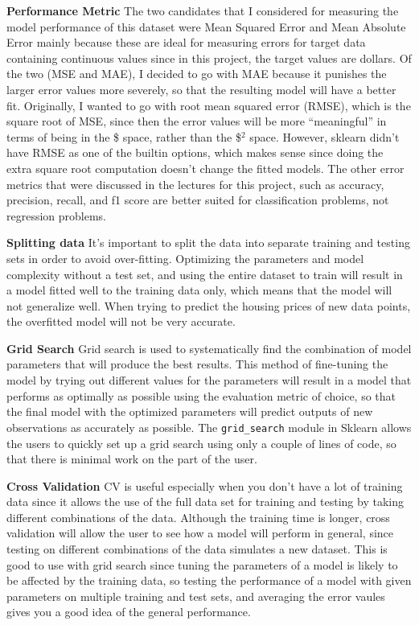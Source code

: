 \documentclass{article}
\begin{document}
    \textbf{Performance Metric} The two candidates that I considered for
measuring the model performance of this dataset were Mean Squared Error
and Mean Absolute Error mainly because these are ideal for measuring
errors for target data containing continuous values since in this
project, the target values are dollars. Of the two (MSE and MAE), I
decided to go with MAE because it punishes the larger error values more
severely, so that the resulting model will have a better fit.
Originally, I wanted to go with root mean squared error (RMSE), which is
the square root of MSE, since then the error values will be more
``meaningful'' in terms of being in the \$ space, rather than the
\$\(^{2}\) space. However, sklearn didn't have RMSE as one of the
builtin options, which makes sense since doing the extra square root
computation doesn't change the fitted models. The other error metrics
that were discussed in the lectures for this project, such as accuracy,
precision, recall, and f1 score are better suited for classification
problems, not regression problems.

\textbf{Splitting data} It's important to split the data into separate
training and testing sets in order to avoid over-fitting. Optimizing the
parameters and model complexity without a test set, and using the entire
dataset to train will result in a model fitted well to the training data
only, which means that the model will not generalize well. When trying
to predict the housing prices of new data points, the overfitted model
will not be very accurate.

\textbf{Grid Search} Grid search is used to systematically find the
combination of model parameters that will produce the best results. This
method of fine-tuning the model by trying out different values for the
parameters will result in a model that performs as optimally as possible
using the evaluation metric of choice, so that the final model with the
optimized parameters will predict outputs of new observations as
accurately as possible. The \texttt{grid\_search} module in Sklearn
allows the users to quickly set up a grid search using only a couple of
lines of code, so that there is minimal work on the part of the user.

\textbf{Cross Validation} CV is useful especially when you don't have a
lot of training data since it allows the use of the full data set for
training and testing by taking different combinations of the data.
Although the training time is longer, cross validation will allow the
user to see how a model will perform in general, since testing on
different combinations of the data simulates a new dataset. This is good
to use with grid search since tuning the parameters of a model is likely
to be affected by the training data, so testing the performance of a
model with given parameters on multiple training and test sets, and
averaging the error vaules gives you a good idea of the general
performance.
\end{document}
